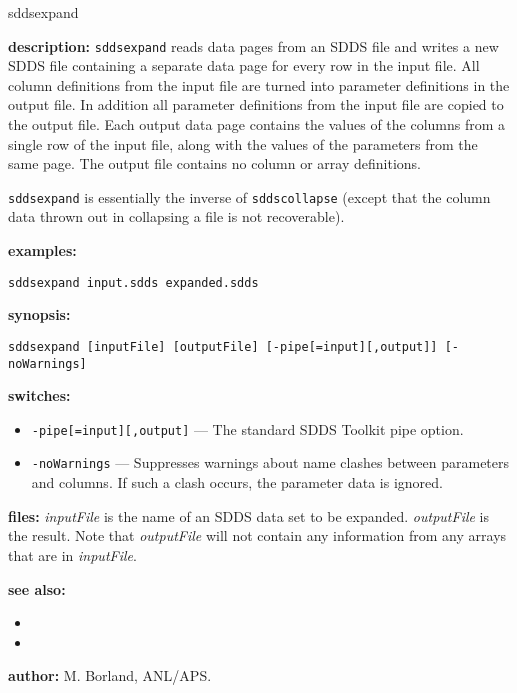 \begin{sddsprog}{sddsexpand}
  \item \textbf{description:} \verb|sddsexpand| reads data pages from an SDDS file and writes a new SDDS file containing a separate data page for every row in the input file. All column definitions from the input file are turned into parameter definitions in the output file. In addition all parameter definitions from the input file are copied to the output file. Each output data page contains the values of the columns from a single row of the input file, along with the values of the parameters from the same page. The output file contains no column or array definitions.

  \verb|sddsexpand| is essentially the inverse of \verb|sddscollapse| (except that the column data thrown out in collapsing a file is not recoverable).
  \item \textbf{examples:}
    \begin{verbatim}
sddsexpand input.sdds expanded.sdds
    \end{verbatim}
  \item \textbf{synopsis:}
    \begin{verbatim}
sddsexpand [inputFile] [outputFile] [-pipe[=input][,output]] [-noWarnings]
    \end{verbatim}
  \item \textbf{switches:}
    \begin{itemize}
      \item \verb|-pipe[=input][,output]| --- The standard SDDS Toolkit pipe option.
      \item \verb|-noWarnings| --- Suppresses warnings about name clashes between parameters and columns. If such a clash occurs, the parameter data is ignored.
    \end{itemize}
  \item \textbf{files:} \emph{inputFile} is the name of an SDDS data set to be expanded. \emph{outputFile} is the result. Note that \emph{outputFile} will not contain any information from any arrays that are in \emph{inputFile}.
  \item \textbf{see also:}
    \begin{itemize}
      \item {}
      \item {}
    \end{itemize}
  \item \textbf{author:} M. Borland, ANL/APS.
\end{sddsprog}

